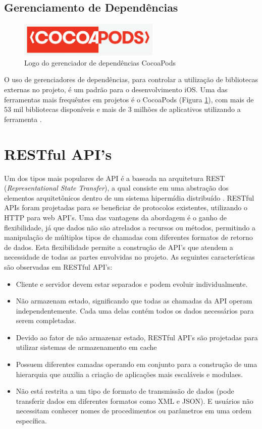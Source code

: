 \subsection{Gerenciamento de Dependências}
\begin{figure}[h]
    \centering
    \includegraphics[width=0.6\textwidth]{pfc/figuras/cocoapods.png}
    \caption{Logo do gerenciador de dependências CocoaPods}
    \label{fig:cocoapods}
\end{figure}
O uso de gerenciadores de dependências, para controlar a utilização de bibliotecas externas no projeto, é um padrão para o desenvolvimento iOS. Uma das ferramentas mais frequêntes em projetos é o CocoaPods (Figura \ref{fig:cocoapods}), com mais de $53$ mil bibliotecas disponíveis e mais de $3$ milhões de aplicativos utilizando a ferramenta .

\section{RESTful API's}
Um dos tipos mais populares de API é a baseada na arquitetura REST (\textit{Representational State Transfer}), a qual consiste em uma abstração dos elementos arquitetônicos dentro de um sistema hipermídia distribuído . 
RESTful APIs foram projetadas para se beneficiar de protocolos existentes, utilizando o HTTP para web API's. Uma das vantagens da abordagem é o ganho de flexibilidade, já que dados não são atrelados a recursos ou métodos, permitindo a manipulação de múltiplos tipos de chamadas com diferentes formatos de retorno de dados. Esta flexibilidade permite a construção de API's que atendem a necessidade de todas as partes envolvidas no projeto. As seguintes características são observadas em RESTful API's:

\begin{itemize}
    \item Cliente e servidor devem estar separados e podem evoluir individualmente.
    \item Não armazenam estado, significando que todas as chamadas da API operam independentemente. Cada uma delas contém todos os dados necessários para serem completadas.
    \item Devido ao fator de não armazenar estado, RESTful API's são projetadas para utilizar sistemas de armazenamento em cache
    \item Possuem diferentes camadas operando em conjunto para a construção de uma hierarquia que auxilia a criação de aplicações mais escaláveis e modulaes.
    \item Não está restrita a um tipo de formato de transmissão de dados (pode transferir dados em diferentes formatos como XML e JSON). E usuários não necessitam conhecer nomes de procedimentos ou parâmetros em uma ordem específica.
\end{itemize}

